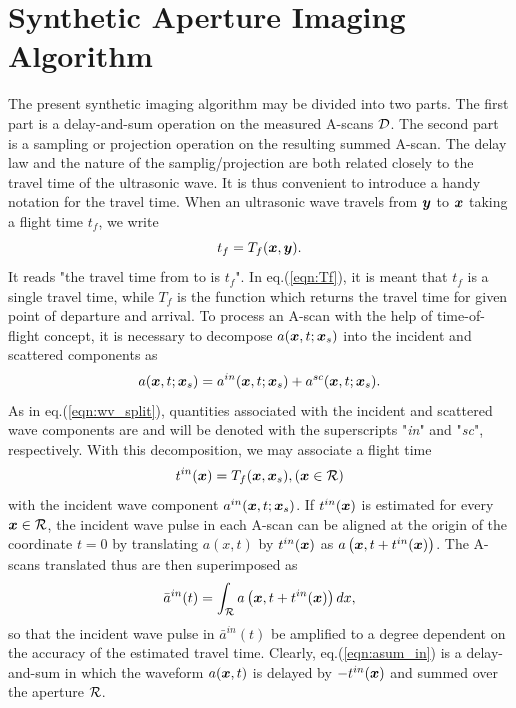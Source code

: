 ﻿\documentclass[11pt,a4j]{article}
\begin{document}
\section{Synthetic Aperture Imaging Algorithm}
\hspace{\parindent}
The present synthetic imaging algorithm may be divided into two parts.
The first part is a delay-and-sum operation on the measured A-scans ${\cal D}$. 
The second part is a sampling or projection operation on the resulting summed A-scan.
The delay law and the nature of the samplig/projection are both related closely 
to the travel time of the ultrasonic wave.
It is thus convenient to introduce a handy notation for the travel time. 
When an ultrasonic wave travels from $\mbox{\boldmath $y$}$ to $\mbox{\boldmath $x$}$ 
 taking a flight time $t_f$, we write
\begin{equation}
	t_f=T_f(\mbox{\boldmath $x$},\mbox{\boldmath $y$}).
	\label{eqn:Tf}
\end{equation}
It reads "the travel time from  to  is $t_f$".
In eq.(\ref{eqn:Tf}), it is meant that $t_f$ is a single travel time, while 
$T_f$ is the function which returns the travel time for given point of 
departure and arrival. 
To process an A-scan with the help of time-of-flight concept, it is necessary to 
decompose $a(\mbox{\boldmath $x$},t;\mbox{\boldmath $x$}_s)$ into the incident and scattered components as 
\begin{equation}
	a(\mbox{\boldmath $x$},t;\mbox{\boldmath $x$}_s)=
	a^{in}(\mbox{\boldmath $x$},t;\mbox{\boldmath $x$}_s)
	+
	a^{sc}(\mbox{\boldmath $x$},t;\mbox{\boldmath $x$}_s).
	\label{eqn:wv_split}
\end{equation}
As in eq.(\ref{eqn:wv_split}), quantities associated with the incident and scattered wave 
components are and will be denoted with the superscripts "{\it in}" and "{\it sc}", respectively.
With this decomposition, we may associate a flight time
\begin{equation}
	t^{in}(\mbox{\boldmath $x$})=T_f(\mbox{\boldmath $x$},\mbox{\boldmath $x$}_s), (\mbox{\boldmath $x$} \in {\cal R})
	\label{eqn:def_tin}
\end{equation}
with the incident wave component $a^{in}(\mbox{\boldmath $x$},t;\mbox{\boldmath $x$}_s)$. 
If $t^{in}(\mbox{\boldmath $x$})$ is estimated for every $\mbox{\boldmath $x$} \in {\cal R}$, 
the incident wave pulse in each A-scan can be aligned at the origin 
of the coordinate $t=0$ by translating $a(x,t)$ by $t^{in}(\mbox{\boldmath $x$})$ as 
$a\left(\mbox{\boldmath $x$},t+t^{in}(\mbox{\boldmath $x$})\right)$.
The A-scans translated thus are then superimposed as 
\begin{equation}
	\bar{a}^{in}(t)=\int_{\cal R} a\left(\mbox{\boldmath $x$},t+t^{in}(\mbox{\boldmath $x$})\right)dx,
	\label{eqn:asum_in}
\end{equation}
so that the incident wave pulse in $\bar{a}^{in}(t)$ be amplified to a degree 
dependent on the accuracy of the estimated travel time.
Clearly, eq.(\ref{eqn:asum_in}) is a delay-and-sum in which the waveform $a(\mbox{\boldmath $x$},t)$ 
is delayed by $-t^{in}(\mbox{\boldmath $x$})$ and summed over the aperture $\cal R$.
\end{document}
